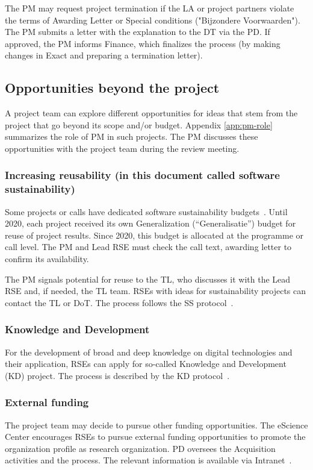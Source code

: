 The PM may request project termination if the LA or project partners violate the terms of Awarding Letter or Special conditions ("Bijzondere Voorwaarden"). 
The PM submits a letter with the explanation to the DT via the PD. If approved, the PM informs Finance, which finalizes the process (by making changes in Exact and preparing a termination letter).

\subsection{Opportunities beyond the project}
\label{sec:opportunities}
A project team can explore different opportunities for ideas that stem from the project that go beyond its scope and/or
budget. Appendix \ref{app:pm-role} summarizes the role of PM in such projects. The PM discusses these opportunities with the project
team during the review meeting.


\subsubsection{Increasing reusability (in this document called software sustainability)}
\label{sec:opportunities:ss}
Some projects or calls have dedicated software sustainability budgets~\cite{nlesc2024software}. Until 2020, each project 
received its own Generalization (“Generalisatie”) budget for reuse of project results.
Since 2020, this budget is allocated at the programme or call level. The PM and Lead RSE must check the call text, awarding 
letter to confirm its availability.

The PM signals potential for reuse to the TL, who discusses it with the Lead RSE and, if needed, the TL team. 
RSEs with ideas for sustainability projects can contact the TL or DoT. The process follows the SS protocol~\cite{intranet}.

\subsubsection{Knowledge and Development}
\label{sec:opportunities:kd}
For the development of broad and deep knowledge on digital technologies and their application, RSEs can apply for
so-called Knowledge and Development (KD) project. The process is described by the KD protocol~\cite{intranet}.

\subsubsection{External funding}
\label{sec:opportunities:external-funding}
The project team may decide to pursue other funding opportunities. The eScience Center encourages RSEs to pursue
external funding opportunities to promote the organization profile as research organization. PD oversees the
Acquisition activities and the process. The relevant information is available via Intranet~\cite{intranet}.


